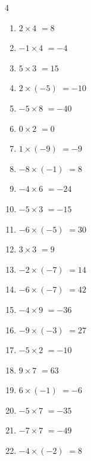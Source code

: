 \begin{multicols}{4}
\begin{enumerate}
  \item $2\times 4$
        $=8$

  \item $-1\times 4$
        $=-4$

  \item $5\times 3$
        $=15$

  \item $2\times (-5)$
        $=-10$

  \item $-5\times 8$
        $=-40$

  \item $0\times 2$
        $=0$

  \item $1\times (-9)$
        $=-9$

  \item $-8\times (-1)$
        $=8$

  \item $-4\times 6$
        $=-24$

  \item $-5\times 3$
        $=-15$

  \item $-6\times (-5)$
        $=30$

  \item $3\times 3$
        $=9$

  \item $-2\times (-7)$
        $=14$

  \item $-6\times (-7)$
        $=42$

  \item $-4\times 9$
        $=-36$

  \item $-9\times (-3)$
        $=27$

  \item $-5\times 2$
        $=-10$

  \item $9\times 7$
        $=63$

\columnbreak %

\resetques

  \item $6\times (-1)$
        $=-6$

  \item $-5\times 7$
        $=-35$

  \item $-7\times 7$
        $=-49$

  \item $-4\times (-2)$
        $=8$


\end{enumerate}
\end{multicols}
